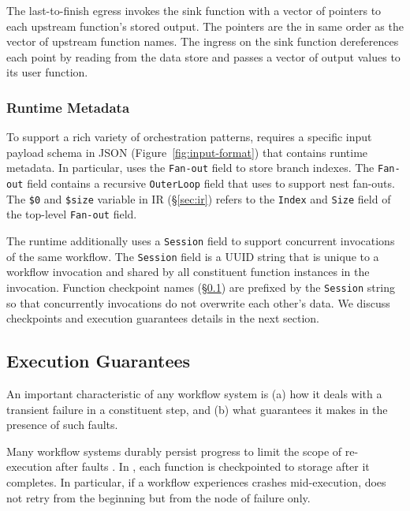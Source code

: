 The last-to-finish egress invokes the sink function with a vector of pointers
to each upstream function's stored output. The pointers are the in same order
as the vector of upstream function names. The ingress on the sink function
dereferences each point by reading from the data store and passes a vector of
output values to its user function.


\subsubsection{Runtime Metadata}

To support a rich variety of orchestration patterns, \name{} requires a
specific input payload schema in JSON (Figure~\ref{fig:input-format}) that
contains \name{} runtime metadata. In particular, \name{} uses the
\texttt{Fan-out} field to store branch indexes. The \texttt{Fan-out} field
contains a recursive \texttt{OuterLoop} field that \name{} uses to support
nest fan-outs. The \texttt{\$0} and \texttt{\$size} variable in
\name{} IR (\S\ref{sec:ir}) refers to the \texttt{Index}  and \texttt{Size}
field of the top-level \texttt{Fan-out} field.

The runtime additionally uses a \texttt{Session} field to support concurrent
invocations of the same workflow. The \texttt{Session} field is a UUID string
that is unique to a workflow invocation and shared by all constituent function
instances in the invocation. Function checkpoint names
(\S\ref{sec:exec-gntee}) are prefixed by the \texttt{Session} string so that
concurrently invocations do not overwrite each other's data. We discuss
\name{} checkpoints and execution guarantees details in the next section.


\subsection{Execution Guarantees}\label{sec:exec-gntee}

An important characteristic of any workflow system is (a) how it deals with  a
transient failure in a constituent step, and (b) what guarantees it makes in
the presence of such faults.
 
Many workflow systems durably persist progress to limit the scope of re-execution after faults
\cite{aws-step-functions, durable-functions, netherite, google-workflows, kappa}.
In \name{}, each function is checkpointed to storage after it
completes. In particular, if a workflow experiences crashes mid-execution,
\name{} does not retry from the beginning but from the node of failure only.

